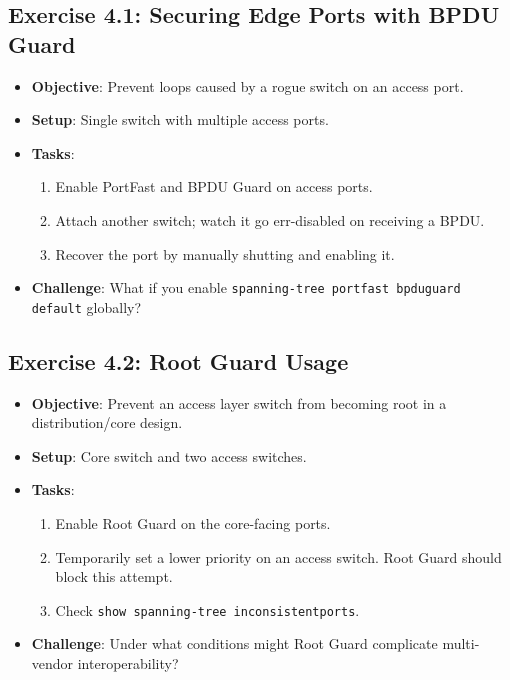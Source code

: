 \documentclass[a4paper]{report}
\begin{document}
\subsection*{Exercise 4.1: Securing Edge Ports with BPDU Guard}
\begin{itemize}
    \item \textbf{Objective}: Prevent loops caused by a rogue switch on an access port.
    \item \textbf{Setup}: Single switch with multiple access ports.
    \item \textbf{Tasks}:
    \begin{enumerate}
        \item Enable PortFast and BPDU Guard on access ports.
        \item Attach another switch; watch it go err-disabled on receiving a BPDU.
        \item Recover the port by manually shutting and enabling it.
    \end{enumerate}
    \item \textbf{Challenge}: What if you enable \texttt{spanning-tree portfast bpduguard default} globally?
\end{itemize}

\subsection*{Exercise 4.2: Root Guard Usage}
\begin{itemize}
    \item \textbf{Objective}: Prevent an access layer switch from becoming root in a distribution/core design.
    \item \textbf{Setup}: Core switch and two access switches.
    \item \textbf{Tasks}:
    \begin{enumerate}
        \item Enable Root Guard on the core-facing ports.
        \item Temporarily set a lower priority on an access switch. Root Guard should block this attempt.
        \item Check \texttt{show spanning-tree inconsistentports}.
    \end{enumerate}
    \item \textbf{Challenge}: Under what conditions might Root Guard complicate multi-vendor interoperability?
\end{itemize}
\end{document}
